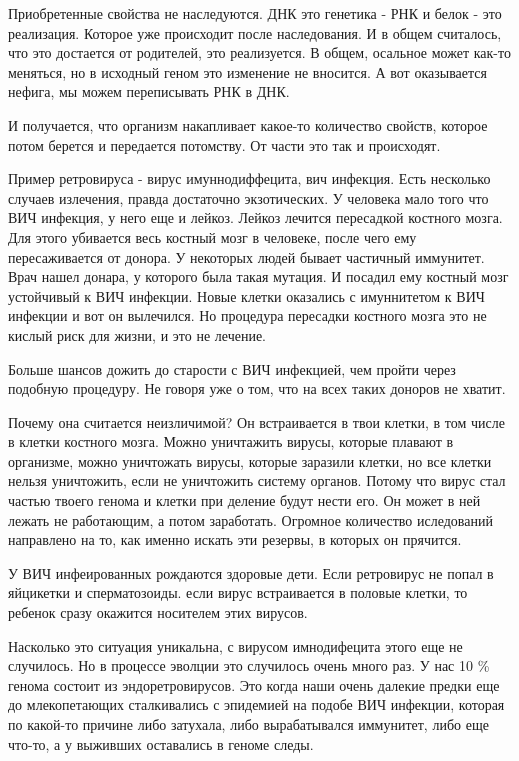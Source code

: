 Приобретенные свойства не наследуются. ДНК это генетика - РНК и белок - это 
реализация. Которое уже происходит после наследования. И в общем считалось, что 
это достается от родителей, это реализуется. В общем, осальное может как-то меняться, 
но в исходный геном это изменение не вносится. А вот оказывается нефига, 
мы можем переписывать РНК в ДНК. 

И получается, что организм накапливает какое-то количество свойств, 
которое потом берется и передается потомству. От части это так и происходят. 


Пример ретровируса - вирус имуннодиффецита, вич инфекция. Есть несколько 
случаев излечения, правда достаточно экзотических. У человека мало того что
ВИЧ инфекция, у него еще и лейкоз. Лейкоз лечится пересадкой костного мозга.
Для этого убивается весь костный мозг в человеке,
после чего ему пересаживается от донора. У некоторых
людей бывает частичный иммунитет. Врач нашел донара, у которого была такая
мутация. И посадил ему костный мозг устойчивый к ВИЧ инфекции. Новые клетки
оказались с имуннитетом к ВИЧ инфекции и вот он вылечился. Но процедура
пересадки костного мозга это не кислый риск для жизни, и это не лечение.

Больше шансов дожить до старости с ВИЧ инфекцией, чем пройти через подобную процедуру.
Не говоря уже о том, что на всех таких доноров не хватит.

Почему она считается неизличимой? Он встраивается в твои клетки, в том
числе в клетки костного мозга. Можно уничтажить вирусы, которые плавают в организме,
можно уничтожать вирусы, которые заразили клетки, но все клетки нельзя уничтожить,
если не уничтожить систему органов. Потому что вирус стал частью твоего генома и
клетки при деление будут нести его. Он может в ней лежать не работающим,
а потом заработать. Огромное количество иследований направлено на то,
как именно искать эти резервы, в которых он прячится.

У ВИЧ инфеированных рождаются здоровые дети. Если ретровирус не попал в яйцикетки и сперматозоиды.
если вирус встраивается в половые клетки, то ребенок сразу окажится носителем этих
вирусов.

Насколько это ситуация уникальна, с вирусом имнодифецита этого еще не случилось. Но
в процессе эволции это случилось очень много раз. У нас 10 \%  генома 
состоит из эндоретровирусов. Это когда наши очень далекие предки еще до млекопетающих 
сталкивались с эпидемией на подобе ВИЧ инфекции, которая по какой-то причине либо затухала, 
либо вырабатывался иммунитет, либо еще что-то, а у выживших 
оставались в геноме следы. 

